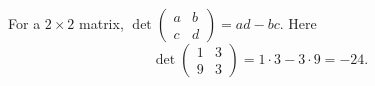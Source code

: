 For a $2\times2$ matrix, $\det\begin{pmatrix}a&b\\c&d\end{pmatrix}=ad-bc$. Here
\[
\det\begin{pmatrix}1&3\\9&3\end{pmatrix}=1\cdot3-3\cdot9=\boxed{-24}.
\]
